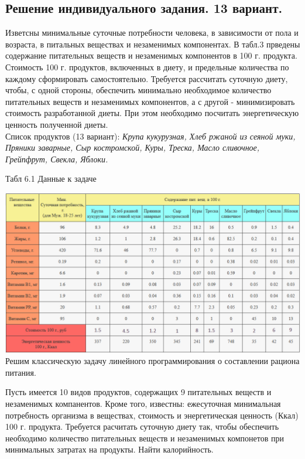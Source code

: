 \documentclass[a4paper, 12pt]{article}
\begin{document}
\subsection{Решение индивидуального задания. 13 вариант.}
Изветсны минимальные суточные потребности человека, в зависимости от пола и возраста, в питальных веществах и незаменимых компонентах. В табл.3 прведены содержание питательных веществ и незаменимых компонентов в 100 г. продукта. Стоимость 100 г. продуктов, включенных в диету, и предельные количества по каждому сформировать самостоятельно. Требуется рассчитать суточную диету, чтобы, с одной стороны, обеспечить минимально необходимое количество питательных веществ и незаменимых компонентов, а с другой - минимизировать стоимость разработанной диеты. При этом необходимо посчитать энергетическую ценность полученной диеты. \\

Список продуктов (13 вариант):
\textit{Крупа кукурузная, Хлеб ржаной из сеяной муки, Пряники заварные, Сыр костромской, Куры, Треска, Масло сливочное, Грейпфрут, Свекла, Яблоки.}\\

\begin{center}
  Табл 6.1 Данные к задаче
\end{center}
\includegraphics[width=\textwidth]{6-5.png}\\

Решим классическую задачу линейного программирования о составлении рациона питания.

Пусть имеется 10 видов продуктов, содержащих 9 питательных веществ и незаменимых компанентов. Кроме того, известны: ежесуточная минимальная потребность организма в веществах, стоимость и энергетическая ценность (Ккал) 100 г. продукта. Требуется расчитать суточную диету так, чтобы обеспечить необходимо количество питательных веществ и незаменимых компонетов при минимальных затратах на продукты. Найти калорийность.
\end{document}
